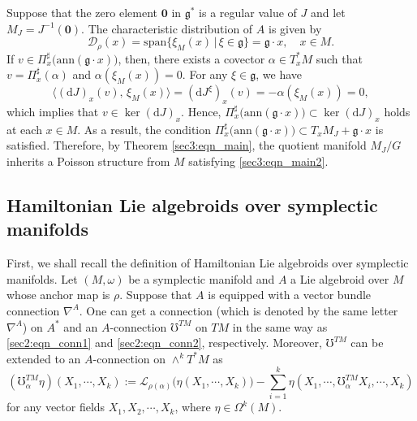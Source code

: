 \documentclass[a4paper,11pt,dvipdfmx]{article}
\numberwithin{equation}{section}
\begin{document}
Suppose that the zero element $\boldsymbol{0}$ in $\mathfrak{g}^*$ is a regular value of $J$ and let $M_J=J^{-1}(\boldsymbol{0})$. 
The characteristic distribution of $A$ is given by 
\[
 \mathcal{D}_{\rho}(x) = \mathrm{span}\bigl\{ \xi_M(x) \,|\, \xi\in \mathfrak{g}\bigr\}=\mathfrak{g}\cdot x,\quad x\in M. 
\]
If $v\in \Pi^{\sharp}_x\bigl(\mathrm{ann}(\mathfrak{g}\cdot x)\bigr)$, then, there exists a covector $\alpha\in T_x^*M$ such that 
$v=\Pi^{\sharp}_x(\alpha)$ and $\alpha(\xi_M(x))=0$. For any $\xi\in\mathfrak{g}$, we have 
\[
 \langle(\mathrm{d}J)_x(v),\, \xi_M(x)\rangle = (\mathrm{d}J^{\xi})_x(v) = -\alpha(\xi_M(x)) = 0,
\]
which implies that $v\in \ker(\mathrm{d}J)_x$. Hence, $\Pi^{\sharp}_x\bigl(\mathrm{ann}(\mathfrak{g}\cdot x)\bigr)\subset \ker(\mathrm{d}J)_x$ holds at each $x\in M$. 
As a result, the condition $\Pi^{\sharp}_x\bigl(\mathrm{ann}(\mathfrak{g}\cdot x)\bigr)\subset T_xM_{J} + \mathfrak{g}\cdot x$ is satisfied. 
Therefore, by Theorem \ref{sec3:eqn_main}, the quotient manifold $M_{J}/G$ inherits a Poisson structure from $M$ satisfying \eqref{sec3:eqn_main2}. 

\subsection{Hamiltonian Lie algebroids over symplectic manifolds}\label{sec4:title2}

First, we shall recall the definition of Hamiltonian Lie algebroids over symplectic manifolds. Let $(M,\omega)$ be a symplectic manifold and $A$ a Lie algebroid over $M$ 
whose anchor map is $\rho$. 
Suppose that $A$ is equipped with a vector bundle connection $\nabla^A$. 
One can get a connection (which is denoted by the same letter $\nabla^A$) on $A^*$ and an $A$-connection $\mho^{TM}$ on $TM$ in the same way as 
\eqref{sec2:eqn_conn1} and \eqref{sec2:eqn_conn2}, respectively. 
Moreover, $\mho^{TM}$ can be extended to an $A$-connection on $\wedge^kT^*M$ as
\begin{equation*}
(\mho_{\alpha}^{TM}\eta)(X_1,\cdots,X_k):= \mathcal{L}_{\rho(\alpha)}\bigl(\eta(X_1,\cdots, X_k)\bigr) 
  - \sum_{i=1}^k\eta(X_1,\cdots,\mho^{TM}_{\alpha}X_i,\cdots,X_k) 
\end{equation*}
for any vector fields $X_1,X_2,\cdots,X_k$, where $\eta\in \Omega^k(M)$. 
\end{document}
